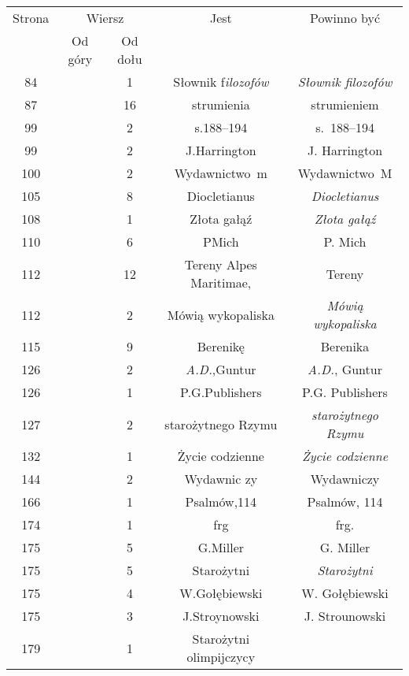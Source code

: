 \documentclass[a4paper,11pt]{article}
\begin{document}
\begin{center}
  \begin{tabular}{|c|c|c|c|c|}
    \hline
    Strona & \multicolumn{2}{c|}{Wiersz} & Jest
                              & Powinno być \\ \cline{2-3}
    & Od góry & Od dołu & & \\
    \hline
    84 & & \hphantom{0}1 & Słownik f\textit{ilozofów}
    & \textit{Słownik filozofów} \\
    \hphantom{0}87 & & 16 & strumienia & strumieniem \\
    \hphantom{0}99 & & \hphantom{0}2 & s.188--194 & s.~188--194 \\
    \hphantom{0}99 & & \hphantom{0}2 & J.Harrington & J. Harrington \\
    100 & & \hphantom{0}2 & Wydawnictwo~m & Wydawnictwo~M \\
    105 & & \hphantom{0}8 & Diocletianus & \textit{Diocletianus} \\
    108 & & \hphantom{0}1 & Złota gałąź & \textit{Złota gałąź} \\
    110 & & \hphantom{0}6 & PMich & P. Mich \\
    112 & & 12 & Tereny Alpes Maritimae, & Tereny \\
    112 & & \hphantom{0}2 & Mówią wykopaliska
    & \textit{Mówią wykopaliska} \\
    115 & & \hphantom{0}9 & Berenikę & Berenika \\
    126 & & \hphantom{0}2 & \textit{A.D.},Guntur & \textit{A.D.}, Guntur \\
    126 & & \hphantom{0}1 & P.G.Publishers & P.G. Publishers \\
    127 & & \hphantom{0}2 & starożytnego Rzymu
    & \textit{starożytnego Rzymu} \\
    132 & & \hphantom{0}1 & Życie codzienne & \textit{Życie codzienne} \\
    144 & & \hphantom{0}2 & Wydawnic zy & Wydawniczy \\
    166 & & \hphantom{0}1 & Psalmów,114 & Psalmów, 114 \\
    174 & & \hphantom{0}1 & frg & frg. \\
    175 & & \hphantom{0}5 & G.Miller & G. Miller \\
    175 & & \hphantom{0}5 & Starożytni & \textit{Starożytni} \\
    175 & & \hphantom{0}4 & W.Gołębiewski & W. Gołębiewski \\
    175 & & \hphantom{0}3 & J.Stroynowski & J. Strounowski \\
    179 & & \hphantom{0}1 & Starożytni olimpijczycy

\end{tabular}
\end{center}
\end{document}
